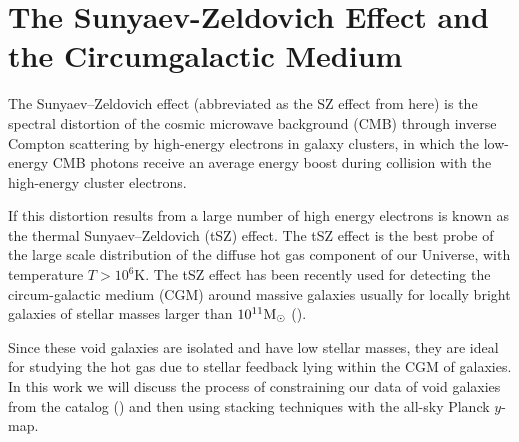 \section{The Sunyaev-Zeldovich Effect and the Circumgalactic Medium}
The Sunyaev–Zeldovich effect (abbreviated as the SZ effect from here) is the spectral distortion of the cosmic microwave background (CMB) through inverse Compton scattering by high-energy electrons in galaxy clusters, in which the low-energy CMB photons receive an average energy boost during collision with the high-energy cluster electrons.
\par 
If this distortion results from a large number of high energy electrons is known as the thermal Sunyaev–Zeldovich (tSZ) effect. The tSZ effect is the best probe of the large scale distribution of the diffuse hot gas component of our Universe, with temperature $T > 10^6 \si{\kelvin}$. The tSZ effect has been recently used for detecting the circum-galactic medium (CGM) around massive galaxies usually for locally bright galaxies of stellar masses larger than $ 10^{11} \textup{M}_{\odot} $ (\cite{planck_collaboration_planck_2013}).
\par 
Since these void galaxies are isolated and have low stellar masses, they are ideal for studying the hot gas due to stellar feedback lying within the CGM of galaxies. In this work we will discuss the process of constraining our data of void galaxies from the catalog (\cite{pan_cosmic_2012}) and then using stacking techniques with the all-sky Planck $ y $-map.


    




